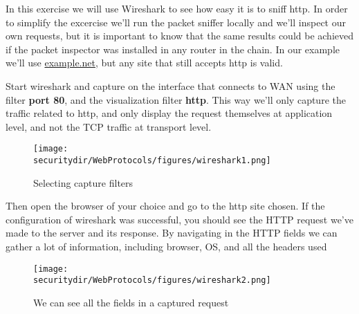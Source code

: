 \begin{Exercise}[label={webprotocols-http-practs}]
In this exercise we will use Wireshark to see how easy it is to sniff http. In order to simplify the excercise we'll run the packet sniffer locally and we'll inspect our own requests, but it is important to know that the same results could be achieved if the packet inspector was installed in any router in the chain. In our example we'll use \url{example.net}, but any site that still accepts http  is valid.


Start wireshark and capture on the interface that connects to WAN using the filter \textbf{port 80}, and the visualization filter \textbf{http}. This way we'll only capture the traffic related to http, and only display the request themselves at application level, and not the TCP traffic at transport level.
\begin{figure}[htb]
	\begin{centering}
		\texttt{[image: \\securitydir/WebProtocols/figures/wireshark1.png]}
		\par
	\end{centering}
	\caption{\label{fig:wireshark1} Selecting capture filters}
\end{figure}

Then open the browser of your choice and go to the http site chosen. If the configuration of wireshark was successful, you should see the HTTP request we've made to the server and its response. By navigating in the HTTP fields we can gather a lot of information, including browser, OS, and all the headers used
\begin{figure}[htb]
	\begin{centering}
		\texttt{[image: \\securitydir/WebProtocols/figures/wireshark2.png]}
		\par\end{centering}
	\caption{\label{fig:wireshark1} We can see all the fields in a captured request}
\end{figure}


\end{Exercise}
